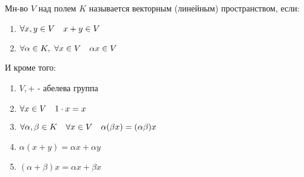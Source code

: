 \documentclass[algebra]{subfiles}
\begin{document}
    \begin{definition}
        Мн-во $V$ над полем $K$ называется векторным (линейным) пространством, если:
        \begin{enumerate}
          \item $\forall x,y \in V \quad x + y \in V$
          \item $\forall \alpha \in K,\ \forall x \in V \quad \alpha x \in V$
        \end{enumerate}
        И кроме того:
        \begin{enumerate}
          \item $V,+$ - абелева группа
          \item $\forall x \in V \quad 1 \cdot x = x$
          \item $\forall \alpha, \beta \in K \quad
          \forall x \in V \quad
          \alpha(\beta x) = (\alpha \beta) x$
          \item $\alpha(x + y) = \alpha x + \alpha y$
          \item $(\alpha + \beta)x = \alpha x + \beta x$
        \end{enumerate}
    \end{definition}
\end{document}
